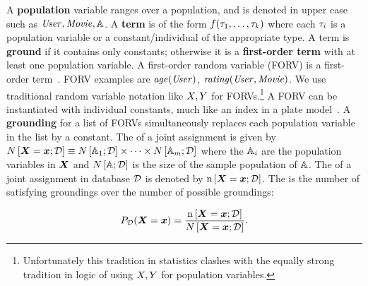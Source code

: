 \documentclass{article}
\begin{document}
A \textbf{population}  variable ranges over a population, and is denoted in upper case such as $\it{User},\it{Movie}, \mathbb{A}$.
A \textbf{term} is of the form $f(\tau_{1},\ldots,\tau_{k})$ where each $\tau_{i}$ is a population variable or a constant/individual of the appropriate type.  
A term is \textbf{ground} if it contains only constants; otherwise it is a \textbf{first-order term} with at least one population variable.
%
A first-order random variable (FORV) is a first-order term~\cite{Wang2008}.
FORV examples are $\it{age}(\it{User})$,%
$\it{rating}(\it{User},\it{Movie})$. %
We 
use traditional random variable notation like $X,Y$ for FORVs.\footnote{Unfortunately this tradition in statistics clashes with the equally strong tradition in logic of using $X,Y$ for population variables.} 
%
% 
 A FORV can be instantiated with individual constants, much like an index in a plate model~\cite{Kimmig2014}. %
 A \textbf{grounding} for a list of FORVs simultaneously replaces each population variable in the list by a constant. The  of a joint assignment is given by $N\left[\boldsymbol{X} = \boldsymbol{x};\mathcal{D}\right] \equiv N\left[\mathbb{A}_{1};\mathcal{D}\right] \times \cdots \times N\left[\mathbb{A}_{m};\mathcal{D}\right]$ where the $\mathbb{A}_{i}$ are the population variables in $\boldsymbol{X}$ and $N\left[\mathbb{A};\mathcal{D}\right]$ is the size of the sample population of $\mathbb{A}$.
The  of a joint assignment in database $\mathcal{D}$ is denoted by 
$\mathrm{n}\left[\boldsymbol{X} = \boldsymbol{x};\mathcal{D}\right]$. 
The  \cite{Halpern90} is the number of satisfying groundings over the number of possible groundings: 

\begin{equation} \label{eq:proportion}
P_{\mathcal{D}}(\boldsymbol{X} = \boldsymbol{x}) 
= \frac
{\mathrm{n}\left[\boldsymbol{X} = \boldsymbol{x};\mathcal{D}\right]}
{N\left[\boldsymbol{X} = \boldsymbol{x};\mathcal{D}\right]
}.
\end{equation}
\end{document}
